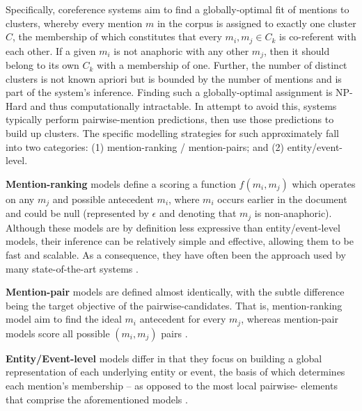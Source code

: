 \documentclass[11pt,a4paper]{article}
\begin{document}
Specifically, coreference systems aim to find a globally-optimal fit of mentions to clusters, whereby every mention $m$ in the corpus is assigned to exactly one cluster $C$, the membership of which constitutes that every ${m_i,m_j} \in C_k$ is co-referent with each other.  If a given $m_i$ is not anaphoric with any other $m_j$, then it should belong to its own $C_k$ with a membership of one.  Further, the number of distinct clusters is not known apriori but is bounded by the number of mentions and is part of the system's inference.  Finding such a globally-optimal assignment is NP-Hard and thus computationally intractable.  In attempt to avoid this, systems typically perform pairwise-mention predictions, then use those predictions to build up clusters. The specific modelling strategies for such approximately fall into two categories: (1) mention-ranking / mention-pairs; and (2) entity/event-level.

\textbf{Mention-ranking} models define a scoring a function $f(m_i,m_j)$ which operates on any $m_j$ and possible antecedent $m_i$, where $m_i$ occurs earlier in the document and could be null (represented by $\epsilon$ and denoting that $m_j$ is non-anaphoric).  Although these models are by definition less expressive than entity/event-level models, their inference can be relatively simple and effective, allowing them to be fast and scalable.  As a consequence, they have often been the approach used by many state-of-the-art systems \cite{Soon:2001:MLA:972597.972602,DBLP:conf/emnlp/DurrettK13,DBLP:journals/corr/WisemanRS16}.

\textbf{Mention-pair} models are defined almost identically, with the subtle difference being the target objective of the pairwise-candidates.  That is, mention-ranking model aim to find the ideal $m_i$ antecedent for every $m_j$, whereas mention-pair models score all possible $(m_i,m_j)$ pairs \cite{Bengtson:2008:UVF:1613715.1613756,Soon:2001:MLA:972597.972602}.

\textbf{Entity/Event-level} models differ in that they focus on building a global representation of each underlying entity or event, the basis of which determines each mention's membership -- as opposed to the most local pairwise- elements that comprise the aforementioned models \cite{DBLP:journals/corr/WisemanRS16,clark2016improving}.
\end{document}
